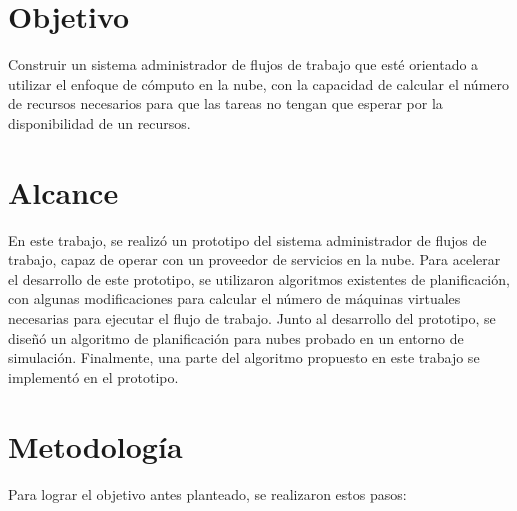 \section{Objetivo}

Construir un sistema administrador de flujos de trabajo que esté orientado a utilizar el enfoque de cómputo en la nube, con la capacidad de calcular el n\'umero de recursos necesarios para que las tareas no tengan que esperar por la disponibilidad de un recursos.

\section{Alcance}

En este trabajo, se realiz\'o un prototipo del sistema administrador de flujos de trabajo, capaz de operar con un proveedor de servicios en la nube. Para acelerar el desarrollo de este prototipo, se utilizaron algoritmos existentes de planificaci\'on, con algunas modificaciones para calcular el n\'umero de m\'aquinas virtuales necesarias para ejecutar el flujo de trabajo. Junto al desarrollo del prototipo, se dise\~n\'o un algoritmo de planificaci\'on para nubes probado en un entorno de simulaci\'on. Finalmente, una parte del algoritmo propuesto en este trabajo se implementó en el prototipo.


\section{Metodolog\'ia}

Para lograr el objetivo antes planteado, se realizaron estos pasos:

